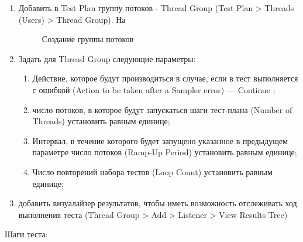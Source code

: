 \begin{enumerate}
\item Добавить в Test Plan группу потоков - Thread Group (Test Plan > Threads (Users) > Thread Group). На

\begin{figure}[ht]
\caption{Создание группы потоков}
\label{ris:testplan.png}
\end{figure}

\item Задать для Thread Group следующие параметры:

\begin{enumerate}
\item Действие, которое будут производиться в случае, если в тест выполняется с ошибкой
(Action to be taken after a Sampler error) --- Continue ;
\item число потоков, в которое будут запускаться шаги тест-плана (Number of Threads) установить равным единице;
\item Интервал, в течение которого будет запущено указанное в предыдущем параметре
число потоков (Ramp-Up Period) установить равным единице;
\item Число повторений набора тестов (Loop Count) установить равным единице;
\end{enumerate}

\item добавить визуалайзер результатов, чтобы иметь возможность отслеживать ход выполнения теста (Thread Group >
Add > Listener > View Results Tree)
\end{enumerate}

Шаги теста:

